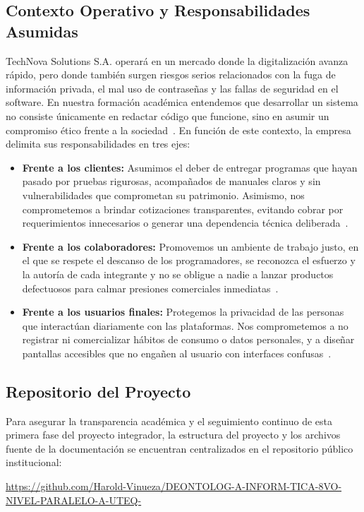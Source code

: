 \documentclass[12pt,a4paper,oneside]{article}
\begin{document}
\subsection{Contexto Operativo y Responsabilidades Asumidas}
TechNova Solutions S.A. operará en un mercado donde la digitalización avanza rápido, pero donde también surgen riesgos serios relacionados con la fuga de información privada, el mal uso de contraseñas y las fallas de seguridad en el software. En nuestra formación académica entendemos que desarrollar un sistema no consiste únicamente en redactar código que funcione, sino en asumir un compromiso ético frente a la sociedad~\cite{gotterbarn2001,sommerville2011}. En función de este contexto, la empresa delimita sus responsabilidades en tres ejes:

\begin{itemize}[leftmargin=1.8em,itemsep=3pt]
    \item \textbf{Frente a los clientes:} Asumimos el deber de entregar programas que hayan pasado por pruebas rigurosas, acompañados de manuales claros y sin vulnerabilidades que comprometan su patrimonio. Asimismo, nos comprometemos a brindar cotizaciones transparentes, evitando cobrar por requerimientos innecesarios o generar una dependencia técnica deliberada~\cite{gotterbarn2001}.
    \item \textbf{Frente a los colaboradores:} Promovemos un ambiente de trabajo justo, en el que se respete el descanso de los programadores, se reconozca el esfuerzo y la autoría de cada integrante y no se obligue a nadie a lanzar productos defectuosos para calmar presiones comerciales inmediatas~\cite{acm2018}.
    \item \textbf{Frente a los usuarios finales:} Protegemos la privacidad de las personas que interactúan diariamente con las plataformas. Nos comprometemos a no registrar ni comercializar hábitos de consumo o datos personales, y a diseñar pantallas accesibles que no engañen al usuario con interfaces confusas~\cite{ieee2020}.
\end{itemize}

\subsection{Repositorio del Proyecto}
Para asegurar la transparencia académica y el seguimiento continuo de esta primera fase del proyecto integrador, la estructura del proyecto y los archivos fuente de la documentación se encuentran centralizados en el repositorio público institucional:
\begin{center}
\url{https://github.com/Harold-Vinueza/DEONTOLOG-A-INFORM-TICA-8VO-NIVEL-PARALELO-A-UTEQ-}
\end{center}
\end{document}
